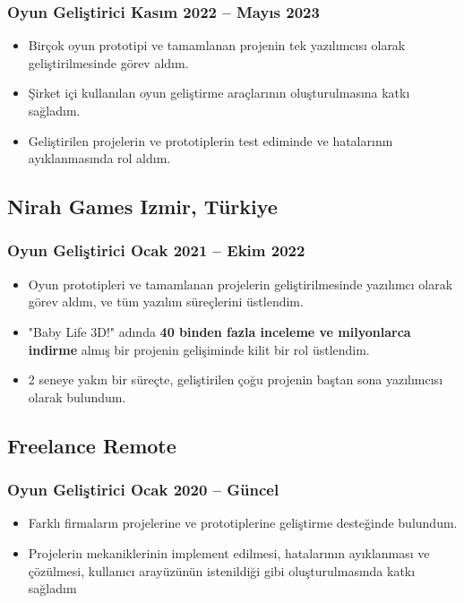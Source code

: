 \documentclass[11pt]{article}
\newcommand{\rside}[1]{
  \hfill {\normalfont\color{accent} #1}%
}
\begin{document}
\subsubsection{Oyun Geliştirici \rside{Kasım 2022 -- Mayıs 2023}}
\begin{itemize}
  \item Birçok oyun prototipi ve tamamlanan projenin tek yazılımcısı olarak geliştirilmesinde görev aldım.
  \item Şirket içi kullanılan oyun geliştirme araçlarının oluşturulmasına katkı sağladım.
  \item Geliştirilen projelerin ve prototiplerin test ediminde ve hatalarının ayıklanmasında rol aldım.
\end{itemize}

\subsection{Nirah Games  \rside{Izmir, Türkiye}}
\subsubsection{Oyun Geliştirici \rside{Ocak 2021 -- Ekim 2022}}
\begin{itemize}
  \item Oyun prototipleri ve tamamlanan projelerin geliştirilmesinde yazılımcı olarak görev aldım, ve tüm yazılım süreçlerini üstlendim.
  \item "Baby Life 3D!" adında \textbf{40 binden fazla inceleme ve milyonlarca indirme} almış bir projenin gelişiminde kilit bir rol üstlendim.
  \item 2 seneye yakın bir süreçte, geliştirilen çoğu projenin baştan sona yazılımcısı olarak bulundum.
\end{itemize}

\subsection{Freelance \rside{Remote}}
\subsubsection{Oyun Geliştirici \rside{Ocak 2020 -- Güncel}}
\begin{itemize}
  \item Farklı firmaların projelerine ve prototiplerine geliştirme desteğinde bulundum.
  \item Projelerin mekaniklerinin implement edilmesi, hatalarının ayıklanması ve çözülmesi, kullanıcı arayüzünün istenildiği gibi oluşturulmasında katkı sağladım
\end{itemize}
\end{document}
